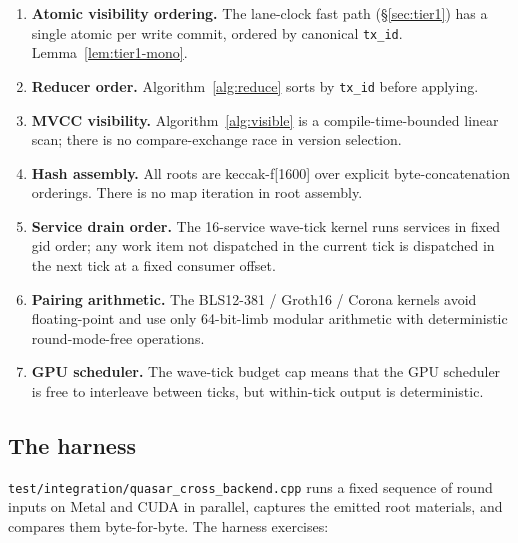 \begin{enumerate}[leftmargin=2em]
\item \textbf{Atomic visibility ordering.} The lane-clock fast path
      (\S\ref{sec:tier1}) has a single atomic per write commit, ordered
      by canonical \texttt{tx\_id}. Lemma~\ref{lem:tier1-mono}.
\item \textbf{Reducer order.} Algorithm~\ref{alg:reduce} sorts by
      \texttt{tx\_id} before applying.
\item \textbf{MVCC visibility.} Algorithm~\ref{alg:visible} is a
      compile-time-bounded linear scan; there is no
      compare-exchange race in version selection.
\item \textbf{Hash assembly.} All roots are keccak-f[1600] over
      explicit byte-concatenation orderings. There is no map iteration
      in root assembly.
\item \textbf{Service drain order.} The 16-service wave-tick kernel
      runs services in fixed gid order; any work item not dispatched
      in the current tick is dispatched in the next tick at a fixed
      consumer offset.
\item \textbf{Pairing arithmetic.} The BLS12-381 / Groth16 / Corona
      kernels avoid floating-point and use only 64-bit-limb modular
      arithmetic with deterministic round-mode-free operations.
\item \textbf{GPU scheduler.} The wave-tick budget cap means that the
      GPU scheduler is free to interleave between ticks, but
      within-tick output is deterministic.
\end{enumerate}

\subsection{The harness}

\texttt{test/integration/quasar\_cross\_backend.cpp} runs a fixed
sequence of round inputs on Metal and CUDA in parallel, captures the
emitted root materials, and compares them byte-for-byte. The harness
exercises:

